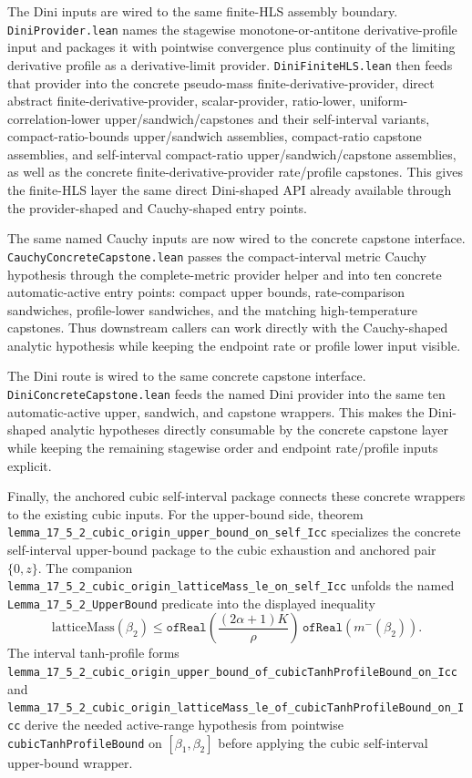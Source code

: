 \documentclass[a4paper,11pt]{article}
\begin{document}
The Dini inputs are wired to the same finite-HLS assembly boundary.
\texttt{DiniProvider.lean} names the stagewise monotone-or-antitone
derivative-profile input and packages it with pointwise convergence plus
continuity of the limiting derivative profile as a derivative-limit provider.
\texttt{DiniFiniteHLS.lean} then feeds that provider into the concrete
pseudo-mass finite-derivative-provider, direct abstract
finite-derivative-provider, scalar-provider, ratio-lower,
uniform-correlation-lower upper/sandwich/capstones and their self-interval variants,
compact-ratio-bounds upper/sandwich assemblies,
compact-ratio capstone assemblies, and self-interval compact-ratio
upper/sandwich/capstone assemblies,
as well as the concrete finite-derivative-provider rate/profile capstones.
This gives the finite-HLS layer the same direct Dini-shaped API already
available through the provider-shaped and Cauchy-shaped entry points.

The same named Cauchy inputs are now wired to the concrete capstone interface.
\texttt{CauchyConcreteCapstone.lean} passes the compact-interval metric Cauchy
hypothesis through the complete-metric provider helper and into ten concrete
automatic-active entry points: compact upper bounds, rate-comparison
sandwiches, profile-lower sandwiches, and the matching high-temperature
capstones.  Thus downstream callers can work directly with the Cauchy-shaped
analytic hypothesis while keeping the endpoint rate or profile lower input
visible.

The Dini route is wired to the same concrete capstone interface.
\texttt{DiniConcreteCapstone.lean} feeds the named Dini provider into the same
ten automatic-active upper, sandwich, and capstone wrappers.  This makes the
Dini-shaped analytic hypotheses directly consumable by the concrete capstone
layer while keeping the remaining stagewise order and endpoint rate/profile
inputs explicit.

Finally, the anchored cubic self-interval package connects these concrete
wrappers to the existing cubic inputs.  For the upper-bound side, theorem
\texttt{lemma\_17\_5\_2\_cubic\_origin\_upper\_bound\_on\_self\_Icc}
specializes the concrete self-interval upper-bound package to the cubic
exhaustion and anchored pair \(\{0,z\}\).  The companion
\texttt{lemma\_17\_5\_2\_cubic\_origin\_latticeMass\_le\_on\_self\_Icc}
unfolds the named \texttt{Lemma\_17\_5\_2\_UpperBound} predicate into the
displayed inequality
\[
  \mathrm{latticeMass}(\beta_2)
  \le
  \texttt{ofReal}\!\left(\frac{(2\alpha+1)K}{\rho}\right)\,
  \texttt{ofReal}\!\left(m^{-}(\beta_2)\right).
\]
The interval tanh-profile forms
\texttt{lemma\_17\_5\_2\_cubic\_origin\_upper\_bound\_of\_cubicTanhProfileBound\_on\_Icc}
and
\texttt{lemma\_17\_5\_2\_cubic\_origin\_latticeMass\_le\_of\_cubicTanhProfileBound\_on\_Icc}
derive the needed active-range hypothesis from pointwise
\texttt{cubicTanhProfileBound} on \([\beta_1,\beta_2]\) before applying the
cubic self-interval upper-bound wrapper.
\end{document}

